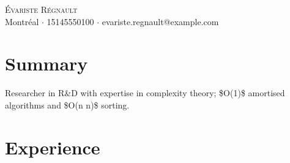 \documentclass[letterpaper,11pt]{article}
\begin{document}
\begin{center}
{\Huge \scshape \'Evariste R\'egnault} \\ \vspace{5pt}
\small Montr\'eal $\cdot$ 15145550100 $\cdot$ evariste.regnault@example.com
\end{center}

\section{Summary}
{\small Researcher in R\&D with expertise in complexity theory; \$O(1)\$ amortised algorithms and \$O(n \log n)\$ sorting.}

\section{Experience}
\end{document}
